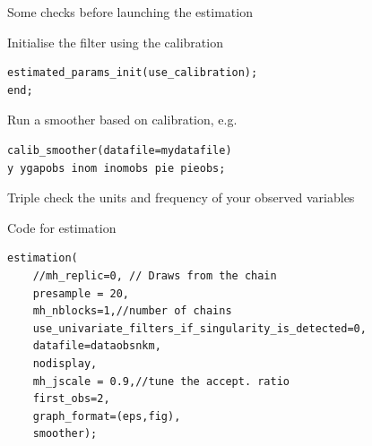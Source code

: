 \begin{frame}[fragile]{Some checks before launching the estimation}
\begin{wideitemize}
\item Initialise the filter using the calibration
\begin{verbatim}
estimated_params_init(use_calibration);
end;
\end{verbatim}
\item Run a smoother based on calibration, e.g.
\begin{verbatim}
calib_smoother(datafile=mydatafile) 
y ygapobs inom inomobs pie pieobs;
\end{verbatim}
\item Triple check the units and frequency of your observed variables
\end{wideitemize}
\end{frame}




\begin{frame}[fragile]{Code for estimation}
\begin{verbatim}
estimation(
    //mh_replic=0, // Draws from the chain
    presample = 20,
    mh_nblocks=1,//number of chains
    use_univariate_filters_if_singularity_is_detected=0,
    datafile=dataobsnkm,
    nodisplay, 
    mh_jscale = 0.9,//tune the accept. ratio
    first_obs=2,
    graph_format=(eps,fig), 
    smoother);
\end{verbatim}
\end{frame}



